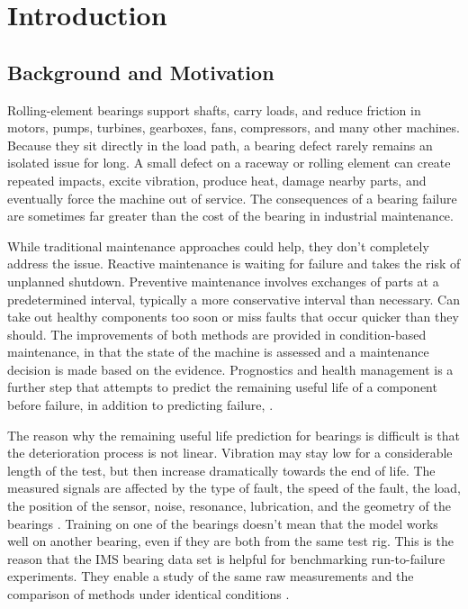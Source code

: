 \chapter{Introduction}
\label{chapter:introduction}

\section{Background and Motivation}

Rolling-element bearings support shafts, carry loads, and reduce friction in motors, pumps, turbines, gearboxes, fans, compressors, and many other machines. Because they sit directly in the load path, a bearing defect rarely remains an isolated issue for long. A small defect on a raceway or rolling element can create repeated impacts, excite vibration, produce heat, damage nearby parts, and eventually force the machine out of service. The consequences of a bearing failure are sometimes far greater than the cost of the bearing in industrial maintenance.

While traditional maintenance approaches could help, they don't completely address the issue. Reactive maintenance is waiting for failure and takes the risk of unplanned shutdown. Preventive maintenance involves exchanges of parts at a predetermined interval, typically a more conservative interval than necessary. Can take out healthy components too soon or miss faults that occur quicker than they should. The improvements of both methods are provided in condition-based maintenance, in that the state of the machine is assessed and a maintenance decision is made based on the evidence. Prognostics and health management is a further step that attempts to predict the remaining useful life of a component before failure, in addition to predicting failure, \cite{jardine2006,lei2018}.

The reason why the remaining useful life prediction for bearings is difficult is that the deterioration process is not linear. Vibration may stay low for a considerable length of the test, but then increase dramatically towards the end of life. The measured signals are affected by the type of fault, the speed of the fault, the load, the position of the sensor, noise, resonance, lubrication, and the geometry of the bearings \cite{wu2022, kannan2024}. Training on one of the bearings doesn't mean that the model works well on another bearing, even if they are both from the same test rig. This is the reason that the IMS bearing data set is helpful for benchmarking run-to-failure experiments. They enable a study of the same raw measurements and the comparison of methods under identical conditions \cite{qiu2006}.

